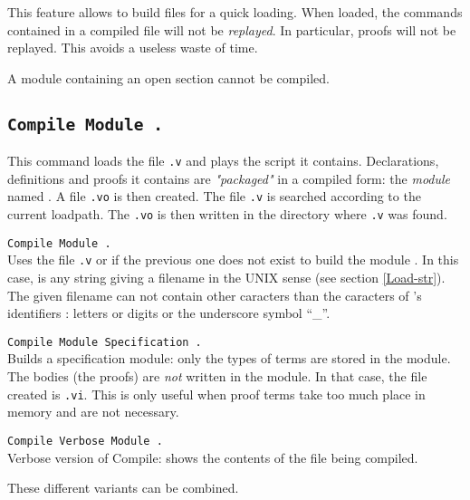 This feature allows to build files for a quick loading. When loaded,
the commands contained in a compiled file will not be {\em replayed}.
In particular, proofs will not be replayed. This avoids a useless
waste of time.

\Rem A module containing an open section cannot be compiled. 

\subsection{\tt Compile Module {\ident}.}
This command loads the file
{\ident}{\tt .v} and plays the script it contains. Declarations,
definitions and proofs it contains are {\em "packaged"} in a compiled
form: the {\em module} named {\ident}.
A file {\ident}{\tt .vo} is then created.
The file {\ident}{\tt .v} is searched according to the
current loadpath.
The {\ident}{\tt .vo} is then written in the directory where
{\ident}{\tt .v} was found.

\begin{Variants}
\item \texttt{Compile Module {\ident} {\str}.}\\ 
  Uses the file {\str}{\tt .v} or {\str} if the previous one does not
  exist to build the module {\ident}. In this case, {\str} is any
  string giving a filename in the UNIX sense (see section
  \ref{Load-str}). 
  \Warning The given filename can not contain other caracters than
  the caracters of \Coq's identifiers : letters or digits or the
  underscore symbol ``\_''.

\item \texttt{Compile Module Specification {\ident}.}\\
  Builds a specification module: only the types of terms are stored
  in the module. The bodies (the proofs) are {\em not} written
  in the module. In that case, the file created is {\ident}{\tt .vi}.
  This is only useful when proof terms take too much place in memory
  and are not necessary.
  
\item \texttt{Compile Verbose Module {\ident}.}\\ 
  Verbose version of Compile: shows the contents of the file being
  compiled.
\end{Variants}

These different variants can be combined.


